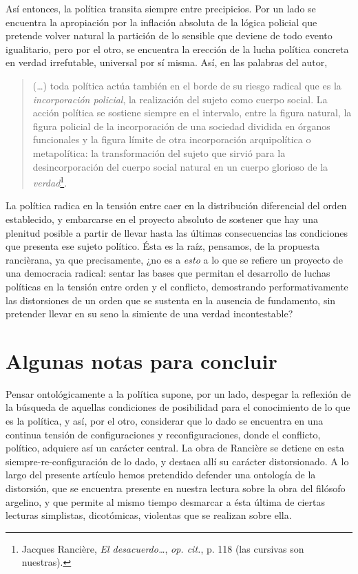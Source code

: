 \documentclass{book}
\begin{document}
Así entonces, la política transita siempre entre precipicios. Por un
lado se encuentra la apropiación por la inflación absoluta de la lógica
policial que pretende volver natural la partición de lo sensible que
deviene de todo evento igualitario, pero por el otro, se encuentra la
erección de la lucha política concreta en verdad irrefutable, universal
por sí misma. Así, en las palabras del autor,

\begin{quote}
(\dots) toda política actúa también en el borde de su riesgo
radical que es la \emph{incorporación policial}, la realización del
sujeto como cuerpo social. La acción política se sostiene siempre en el
intervalo, entre la figura natural, la figura policial de la
incorporación de una sociedad dividida en órganos funcionales y la
figura límite de otra incorporación arquipolítica o metapolítica: la
transformación del sujeto que sirvió para la desincorporación del cuerpo
social natural en un cuerpo glorioso de la \emph{verdad}\footnote{Jacques
  Rancière, \emph{El desacuerdo\ldots{}}, \emph{op. cit.}, p. 118 (las
  cursivas son nuestras).}.
\end{quote}

La política radica en la tensión entre caer en la distribución
diferencial del orden establecido, y embarcarse en el proyecto absoluto
de sostener que hay una plenitud posible a partir de llevar hasta las
últimas consecuencias las condiciones que presenta ese sujeto político.
Ésta es la raíz, pensamos, de la propuesta rancièrana, ya que
precisamente, ¿no es a \emph{esto} a lo que se refiere un proyecto de
una democracia radical: sentar las bases que permitan el desarrollo de
luchas políticas en la tensión entre orden y el conflicto, demostrando
performativamente las distorsiones de un orden que se sustenta en la
ausencia de fundamento, sin pretender llevar en su seno la simiente de
una verdad incontestable?

\section{Algunas notas para concluir}

Pensar ontológicamente a la política supone, por un lado, despegar la
reflexión de la búsqueda de aquellas condiciones de posibilidad para el
conocimiento de lo que es la política, y así, por el otro, considerar
que lo dado se encuentra en una continua tensión de configuraciones y
reconfiguraciones, donde el conflicto, político, adquiere así un
carácter central. La obra de Rancière se detiene en esta
siempre-re-configuración de lo dado, y destaca allí su carácter
distorsionado. A lo largo del presente artículo hemos pretendido
defender una ontología de la distorsión, que se encuentra presente en
nuestra lectura sobre la obra del filósofo argelino, y que permite al
mismo tiempo desmarcar a ésta última de ciertas lecturas simplistas,
dicotómicas, violentas que se realizan sobre ella.
\end{document}
